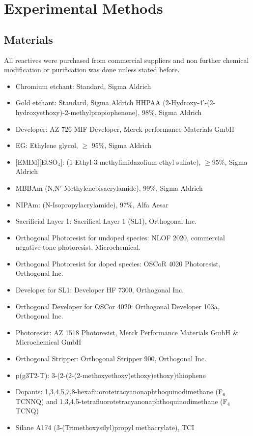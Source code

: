 \chapter{Experimental Methods} \label{cha:2}

\section{Materials}
All reactives were purchased from commercial suppliers and non further chemical modification or purification was done unless stated before.

\begin{itemize}
\item Chromium etchant: Standard, Sigma Aldrich
\item Gold etchant: Standard, Sigma Aldrich HHPAA (2-Hydroxy-4’-(2-hydroxyethoxy)-2-methylpropiophenone), 98$\%$, Sigma Aldrich 
\item Developer: AZ 726 MIF Developer, Merck performance Materials GmbH
\item EG: Ethylene glycol, $\geq$ 95$\%$, Sigma Aldrich
\item $[$EMIM$][$EtSO$_{4}]$: (1-Ethyl-3-methylimidazolium ethyl sulfate), $\geq$95$\%$, Sigma Aldrich 
\item MBBAm (N,N’-Methylenebisacrylamide), 99$\%$, Sigma Aldrich 
\item NIPAm: (N-Isopropylacrylamide), 97$\%$, Alfa Aesar 
\item Sacrificial Layer 1: Sacrifical Layer 1 (SL1), Orthogonal Inc. 
\item Orthogonal Photoresist for undoped species: NLOF 2020, commercial negative-tone photoresist, Microchemical.
\item Orthogonal Photoresist for doped species: OSCoR 4020 Photoresist, Orthogonal Inc.
\item Developer for SL1: Developer HF 7300, Orthogonal Inc.
\item Orthogonal Developer for OSCor 4020: Orthogonal Developer 103a, Orthogonal Inc.
\item Photoresist: AZ 1518 Photoresist, Merck Performance Materials GmbH \& Microchemical GmbH 
\item Orthogonal Stripper: Orthogonal Stripper 900, Orthogonal Inc. 
\item p(g3T2-T): 3-(2-(2-(2-methoxyethoxy)ethoxy)ethoxy)thiophene
\item Dopants: 1,3,4,5,7,8-hexafluorotetracyanonaphthoquinodimethane (F$_{6}$TCNNQ) and 1,3,4,5-tetrafluorotetracyanonaphthoquinodimethane (F$_{4}$TCNQ)
\item Silane A174 (3-(Trimethoxysilyl)propyl methacrylate), TCI

\end{itemize}

